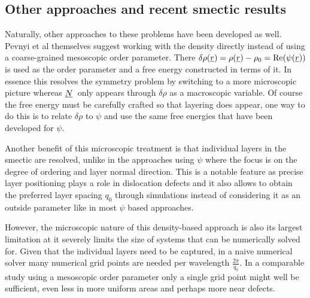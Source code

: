 \documentclass[12pt]{article}
\newcommand{\suf}[2]{\stackunder[0.5pt]{\stackunder[1pt]{\ensuremath{#1}}{\rule{\widthof{\ensuremath{#2}}*\real{0.9}}{.1ex}}}{}}
\newcommand{\su}[1]{\suf{#1}{#1}}
\newcommand{\NN}{\ensuremath{\su{N}}}
\begin{document}
    \subsection{Other approaches and recent smectic results}\label{sec:sm_other}
        Naturally, other approaches to these problems have been developed as well.
        Pevnyi et al themselves suggest working with the density directly instead of using a coarse-grained mesoscopic order parameter\cite{pevnyiModelingSmecticLayers2014,xiaStructuralLandscapesGeometrically2021,farrellFiniteelementDiscretizationSmectic2023,xiaSimpleTensorialTheory2024}.
        There $\delta\rho(\su{r}) = \rho(\su{r}) - \rho_0 = \Re(\psi(\su{r}))$ is used as the order parameter and a free energy constructed in terms of it.
        In essence this resolves the symmetry problem by switching to a more microscopic picture whereas \NN\ only appears through $\delta\rho$ as a macroscopic variable.
        Of course the free energy must be carefully crafted so that layering does appear, one way to do this is to relate $\delta\rho$ to $\psi$ and use the same free energies that have been developed for $\psi$\cite{pevnyiModelingSmecticLayers2014}.

        Another benefit of this microscopic treatment is that individual layers in the smectic are resolved, unlike in the approaches using $\psi$ where the focus is on the degree of ordering and layer normal direction.
        This is a notable feature as precise layer positioning plays a role in dislocation defects  and it also allows to obtain the preferred layer spacing $q_0$ through simulations instead of considering it as an outside parameter like in most $\psi$ based approaches.

        However, the microscopic nature of this density-based approach is also its largest limitation at it severely limits the size of systems that can be numerically solved for.
        Given that the individual layers need to be captured, in a naive numerical solver many numerical grid points are needed per wavelength $\frac{2\pi}{q_0}$.
        In a comparable study using a mesoscopic order parameter only a single grid point might well be sufficient, even less in more uniform areas and perhaps more near defects.
\end{document}
